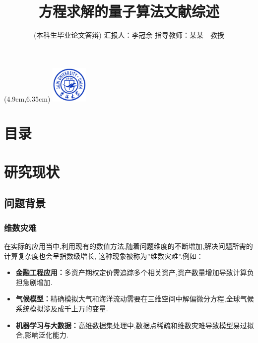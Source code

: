 \documentclass{beamer}
\title{方程求解的量子算法文献综述}
\author[李冠余]{
	{\fontsize{11pt}{13pt}\selectfont(本科生毕业论文答辩)}
	\vskip 15pt \hspace{-7pt}汇报人：李冠余
	\vskip 5pt 指导教师：某某~~教授}
\institute{吉林大学数学学院}
\date{}
\begin{document}
	\begin{spacing}{1.2}
	\setlength{\parindent}{1em}
	{\fontsize{8.5pt}{13pt}\selectfont
	\begin{frame}%
		\vspace{-0.5cm}
		\titlepage
		\vfill
		\begin{textblock*}{5cm}(4.9cm,6.35cm)  
			\includegraphics[width=1.8cm]{jd-xhh.jpg}  %
		\end{textblock*}
		\vspace*{1cm}
	\end{frame}

    \section*{目录}
    	\begin{frame}
    		\frametitle{\secname}
    		\tableofcontents[sections={<1-4>}]
    		
    	\end{frame}
    	\AtBeginSubsection[]{
    		\begin{frame}<handout:0>
    			\frametitle{目录}
    			\tableofcontents[currentsection,currentsubsection,sections={<1-4>}]
    		\end{frame}
    		\addtocounter{framenumber}{-1}  %
    	}
    
    
    \section{研究现状}
    \subsection{问题背景}
    \begin{frame}
    \frametitle{维数灾难}
     在实际的应用当中,利用现有的数值方法,随着问题维度的不断增加,解决问题所需的计算复杂度也会呈指数级增长, 这种现象被称为”维数灾难”.例如：
     \vspace{5pt}
    		\begin{itemize}
    			\item \textbf{金融工程应用：}多资产期权定价需追踪多个相关资产,资产数量增加导致计算负担急剧增加.
    			\item \textbf{气候模型：}精确模拟大气和海洋流动需要在三维空间中解偏微分方程,全球气候系统模拟涉及成千上万的变量.
    			\item \textbf{机器学习与大数据：}高维数据集处理中,数据点稀疏和维数灾难导致模型易过拟合,影响泛化能力.
    		\end{itemize}
 \end{frame}

}
\end{spacing}
\end{document}
